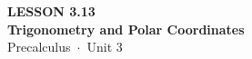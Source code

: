 \documentclass[aspectratio=169, 11pt]{beamer}
\begin{document}
{
\begin{frame}[plain]
  \vspace{2.8cm}\hspace{0.55cm}%
  \begin{minipage}{0.9\textwidth}
    {\color{goldacc}\bfseries\small LESSON 3.13}\\[0.5cm]
    {\color{white}\bfseries\LARGE Trigonometry and Polar Coordinates}\\[1.2cm]
    {\color{skymid}\small Precalculus~$\cdot$~Unit 3}
  \end{minipage}
\end{frame}
}

\end{document}
